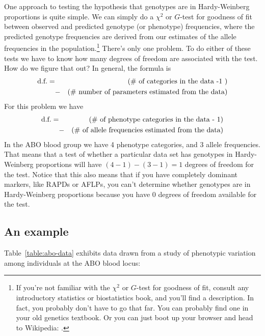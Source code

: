One approach to testing the hypothesis that genotypes are in
Hardy-Weinberg proportions is quite simple. We can simply do a
$\chi^2$ or $G$-test for goodness of fit between observed and
predicted genotype (or phenotype) frequencies, where the predicted
genotype frequencies are derived from our estimates of the allele
frequencies in the population.\footnote{If you're not familiar with
  the $\chi^2$ or $G$-test for goodness of fit, consult any
  introductory statistics or biostatistics book, and you'll find a
  description. In fact, you probably don't have to go that far. You
  can probably find one in your old genetics textbook. Or you can just
  boot up your browser and head to Wikipedia:
  . } There's only one problem. To do
either of these tests we have to know how many degrees of freedom are
associated with the test. How do we figure that out? In general, the
formula is
\begin{eqnarray*}
\hbox{d.f.} = && (\hbox{\# of categories in the data -1 }) \\ 
&-& (\hbox{\#
              number of parameters estimated from the data})
\end{eqnarray*}
For this problem we have
\begin{eqnarray*}
\hbox{d.f.} = && (\hbox{\# of phenotype categories in the data - 1}) \\
&-& (\hbox{\# of allele frequencies estimated from the data})
\end{eqnarray*}
In the ABO blood group we have 4 phenotype categories, and 3
allele frequencies. That means that a test of whether a particular
data set has genotypes in Hardy-Weinberg proportions will have
$(4-1)-(3-1) = 1$ degrees of freedom for the test. Notice that this
also means that if you have completely dominant markers, like RAPDs or
AFLPs, you can't determine whether genotypes are in Hardy-Weinberg
proportions because you have 0 degrees of freedom available for the
test.

\subsection*{An example}

Table~\ref{table:abo-data} exhibits data drawn from a study of
phenotypic variation among individuals at the ABO blood locus:

